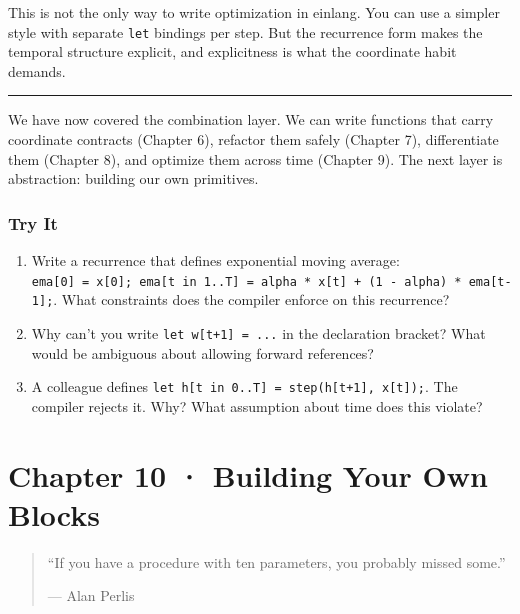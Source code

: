 \documentclass[11pt,]{article}
\begin{document}
This is not the only way to write optimization in einlang. You can use a
simpler style with separate \texttt{let} bindings per step. But the
recurrence form makes the temporal structure explicit, and explicitness
is what the coordinate habit demands.

\begin{center}\rule{0.5\linewidth}{0.4pt}\end{center}

We have now covered the combination layer. We can write functions that
carry coordinate contracts (Chapter 6), refactor them safely (Chapter
7), differentiate them (Chapter 8), and optimize them across time
(Chapter 9). The next layer is abstraction: building our own primitives.

\hypertarget{try-it-8}{%
\subsubsection{Try It}\label{try-it-8}}

\begin{enumerate}
\def\labelenumi{\arabic{enumi}.}
\item
  Write a recurrence that defines exponential moving average:
  \texttt{ema{[}0{]}\ =\ x{[}0{]};\ ema{[}t\ in\ 1..T{]}\ =\ alpha\ *\ x{[}t{]}\ +\ (1\ -\ alpha)\ *\ ema{[}t-1{]};}.
  What constraints does the compiler enforce on this recurrence?
\item
  Why can't you write \texttt{let\ w{[}t+1{]}\ =\ ...} in the
  declaration bracket? What would be ambiguous about allowing forward
  references?
\item
  A colleague defines
  \texttt{let\ h{[}t\ in\ 0..T{]}\ =\ step(h{[}t+1{]},\ x{[}t{]});}. The
  compiler rejects it. Why? What assumption about time does this
  violate?
\end{enumerate}

\newpage

\hypertarget{chapter-10-building-your-own-blocks}{%
\section{Chapter 10 · Building Your Own
Blocks}\label{chapter-10-building-your-own-blocks}}

\begin{quote}
``If you have a procedure with ten parameters, you probably missed
some.''

--- Alan Perlis
\end{quote}
\end{document}
